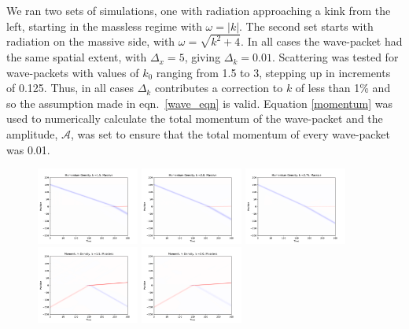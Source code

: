 \documentclass[11pt, oneside]{article}  	%
\numberwithin{equation}{section}
\begin{document}
We ran two sets of simulations, one with radiation approaching a kink from the left, starting in the massless regime with $\omega = |k|$. The second set starts with radiation on the massive side, with $\omega = \sqrt{k^2 + 4}$. In all cases the wave-packet had the same spatial extent, with $\Delta_x = 5$, giving $\Delta_k = 0.01$. Scattering was tested for wave-packets with values of $k_0$ ranging from 1.5 to 3, stepping up in increments of 0.125. Thus, in all cases $\Delta_k$ contributes a correction to $k$ of less than 1\% and so the assumption made in eqn.~\ref{wave_eqn} is valid. Equation \ref{momentum} was used to numerically calculate the total momentum of the wave-packet and the amplitude, $\mathcal{A}$, was set to ensure that the total momentum of every wave-packet was 0.01.\par
\begin{figure}
\centering
\includegraphics[width=0.3\textwidth]{MomentumDensityk15Massive.pdf}
\includegraphics[width=0.3\textwidth]{MomentumDensityk20Massive.pdf}
\includegraphics[width=0.3\textwidth]{MomentumDensityk275Massive.pdf}
\includegraphics[width=0.3\textwidth]{MomentumDensityk15Massless.pdf}
\includegraphics[width=0.3\textwidth]{MomentumDensityk20Massless.pdf}

\end{figure}
\end{document}
